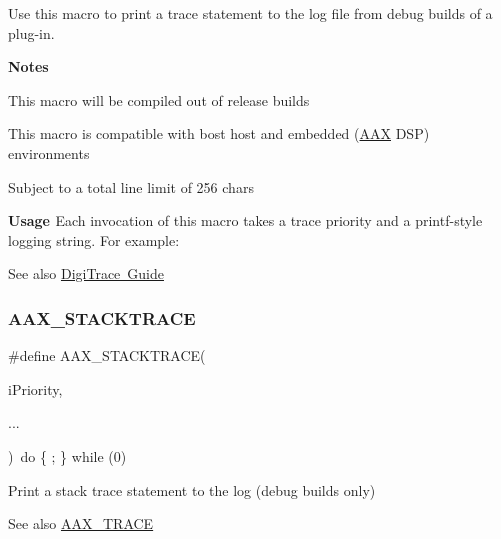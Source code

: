 Use this macro to print a trace statement to the log file from debug builds of a plug-\/in.

{\bfseries{Notes }}
\begin{DoxyItemize}
\item This macro will be compiled out of release builds
\item This macro is compatible with bost host and embedded (\mbox{\hyperlink{a00852}{A\+AX}} D\+SP) environments
\item Subject to a total line limit of 256 chars
\end{DoxyItemize}

{\bfseries{Usage }} Each invocation of this macro takes a trace priority and a {\ttfamily printf}-\/style logging string. For example\+:


\begin{DoxyCode}{0}
\end{DoxyCode}


\begin{DoxySeeAlso}{See also}
\mbox{\hyperlink{a00834}{Digi\+Trace Guide}} 
\end{DoxySeeAlso}
\mbox{\label{a00395_ae871829dd7297e4a5ae6c7094f6b5398}} 
\subsubsection{\texorpdfstring{AAX\_STACKTRACE}{AAX\_STACKTRACE}}
{\footnotesize\ttfamily \#define A\+A\+X\+\_\+\+S\+T\+A\+C\+K\+T\+R\+A\+CE(\begin{DoxyParamCaption}\item[{}]{i\+Priority,  }\item[{}]{... }\end{DoxyParamCaption})~do \{ ; \} while (0)}



Print a stack trace statement to the log (debug builds only) 

\begin{DoxySeeAlso}{See also}
\mbox{\hyperlink{a00395_ab53f1d6a94f8b6ebb3a101f71bfe4e82}{A\+A\+X\+\_\+\+T\+R\+A\+CE}} 
\end{DoxySeeAlso}
\mbox{\label{a00395_a96862f9cb28b6a49eb5dbd6da9975ed1}} 
